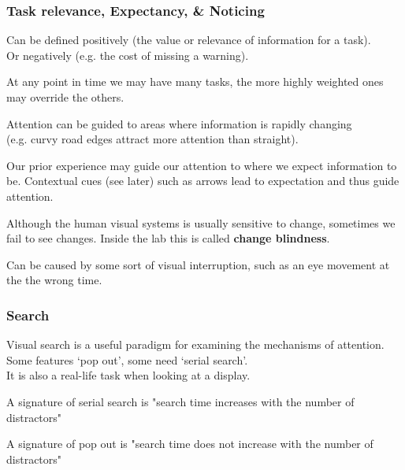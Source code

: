 \documentclass[]{project_plan}
\begin{document}
\subsubsection{Task relevance, Expectancy, \& Noticing}
Can be defined positively (the value or relevance of information for a task).\\
Or negatively (e.g. the cost of missing a warning).

At any point in time we may have many tasks, the more highly weighted ones may
override the others.

Attention can be guided to areas where information is rapidly changing\\
(e.g. curvy road edges attract more attention than straight).

Our prior experience may guide our attention to where we expect information to
be. Contextual cues (see later) such as arrows lead to expectation and thus guide
attention.

Although the human visual systems is usually sensitive to change, sometimes we
fail to see changes. Inside the lab this is called \textbf{change blindness}.

Can be caused by some sort of visual interruption, such as an eye movement at the
the wrong time.

\subsubsection{Search}
Visual search is a useful paradigm for examining the mechanisms of attention.\\
Some features ‘pop out’, some need ‘serial search’.\\
It is also a real-life task when looking at a display.

A signature of serial search is "search time increases with the number of distractors"

A signature of pop out is "search time does not increase with the number of distractors"

\newpage
\end{document}
